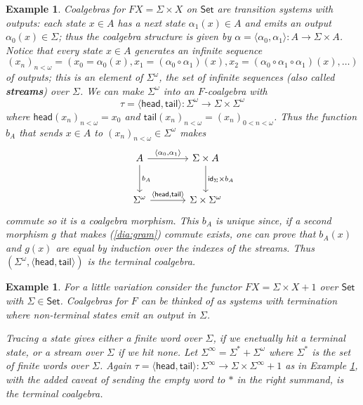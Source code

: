 \documentclass[letterpaper, 11pt, oneside]{memoir}
\theoremstyle{myteo}
\newtheorem{example}[theorem]{Example}
\numberwithin{equation}{section}
\newcommand{\marginnote}[1]{\marginpar{\footnotesize #1}}
\newcommand{\id}{\textsf{id}}
\newcommand{\head}{\textsf{head}}
\newcommand{\tail}{\textsf{tail}}
\newcommand{\Set}{\textsf{Set}}
\newcommand{\intoprod}[2]{{\langle #1, #2\rangle}}
\begin{document}
\begin{example}
  \label{ex:transition_systems_with_outputs}
  Coalgebras for \(FX = \Sigma \times X\) on \(\Set\) are transition systems with outputs: each state \(x \in A\) has a next state \(\alpha_1(x) \in A\) and emits an output \(\alpha_0(x) \in \Sigma\); thus the coalgebra structure is given by \(\alpha = \intoprod{\alpha_0}{\alpha_1} : A \to \Sigma \times A\).
  Notice that every state \(x \in A\) generates an infinite sequence
  \begin{equation*}
    (x_n)_{n < \omega} = (x_0 = \alpha_0(x), x_1 = (\alpha_0 \circ \alpha_1)(x), x_2 = (\alpha_0 \circ \alpha_1 \circ \alpha_1)(x), \ldots)
  \end{equation*}
  of outputs; this is an element of \(\Sigma^\omega\), the set of infinite sequences (also called \textbf{streams}\marginnote{\(\Sigma\)-streams}) over \(\Sigma\).
  We can make \(\Sigma^\omega\) into an \(F\)-coalgebra with
  \begin{equation*}
    \tau = \intoprod{\head}{\tail} : \Sigma^\omega \to \Sigma \times \Sigma^\omega
  \end{equation*}
  where \(\head(x_n)_{n < \omega} = x_0\) and \(\tail(x_n)_{n < \omega} = (x_n)_{0 < n < \omega}\).
  Thus the function \(b_A\) that sends \(x \in A\) to \((x_n)_{n < \omega} \in \Sigma^\omega\) makes
  \begin{equation}
    \label{dia:gram}
    \begin{tikzcd}[sep=large]
      A \ar[r, "\intoprod{\alpha_0}{\alpha_1}"] \ar[d, "b_A"] & \Sigma \times A  \ar[d, "\id_\Sigma \times b_A"] \\
      \Sigma^\omega \ar[r, "\intoprod{\head}{\tail}"] & \Sigma \times \Sigma^\omega
    \end{tikzcd}
  \end{equation}
  commute so it is a coalgebra morphism.
  This \(b_A\) is unique since, if a second morphism \(g\) that makes (\ref{dia:gram}) commute exists, one can prove that \(b_A(x)\) and \(g(x)\) are equal by induction over the indexes of the streams.
  Thus \((\Sigma^\omega, \intoprod{\head}{\tail})\) is the terminal coalgebra.
\end{example}

\begin{example}
  For a little variation consider the functor \(FX = \Sigma \times X + 1\) over \(\Set\) with \(\Sigma \in \Set\).
  Coalgebras for \(F\) can be thinked of as systems with termination where non-terminal states emit an output in \(\Sigma\).

  Tracing a state gives either a finite word over \(\Sigma\), if we enetually hit a terminal state, or a stream over \(\Sigma\) if we hit none.
  Let \(\Sigma^\infty = \Sigma^* + \Sigma^\omega\) where \(\Sigma^*\) is the set of finite words over \(\Sigma\).
  Again \(\tau = \intoprod{\head}{\tail} : \Sigma^\infty \to \Sigma \times \Sigma^\infty + 1\) as in Example \ref{ex:transition_systems_with_outputs}, with the added caveat of sending the empty word to \(*\) in the right summand, is the terminal coalgebra.
\end{example}
\end{document}
